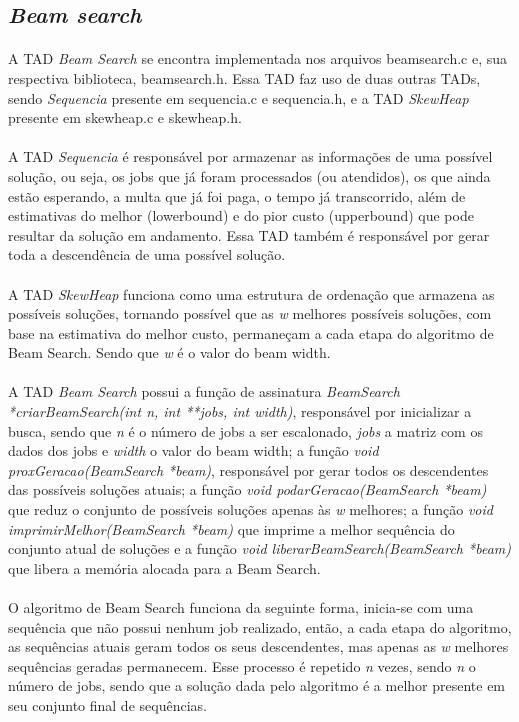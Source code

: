 \documentclass[12pt,a4paper]{article}
\begin{document}
  \subsection{{\it Beam search}}
   {\paragraph{} A TAD {\it Beam Search} se encontra implementada nos arquivos beamsearch.c e, sua respectiva biblioteca, beamsearch.h.
   Essa TAD faz uso de duas outras TADs, sendo {\it Sequencia} presente em sequencia.c e sequencia.h, e a TAD {\it SkewHeap} presente
   em skewheap.c e skewheap.h.}
   {\paragraph{} A TAD {\it Sequencia} é responsável por armazenar as informações de uma possível solução, ou seja, os jobs
   que já foram processados (ou atendidos), os que ainda estão esperando, a multa que já foi paga, o tempo já transcorrido, além
   de estimativas do melhor (lowerbound) e do pior custo (upperbound) que pode resultar da solução em andamento. Essa TAD também é responsável por gerar
   toda a descendência de uma possível solução.}
   {\paragraph{} A TAD {\it SkewHeap} funciona como uma estrutura de ordenação que armazena as possíveis soluções, tornando
   possível que as \emph{w} melhores possíveis soluções, com base na estimativa do melhor custo, permaneçam a cada etapa do
   algoritmo de Beam Search. Sendo que \emph{w} é o valor do beam width.}
   {\paragraph{} A TAD {\it Beam Search} possui a função de assinatura \emph{BeamSearch *criarBeamSearch(int n, int **jobs, int width)},
   responsável por inicializar a busca, sendo que \emph{n} é o número de jobs a ser escalonado, \emph{jobs} a matriz com os dados
   dos jobs e \emph{width} o valor do beam width; a função \emph{void proxGeracao(BeamSearch *beam)}, responsável por gerar todos os descendentes
   das possíveis soluções atuais; a função \emph{void podarGeracao(BeamSearch *beam)} que reduz o conjunto de possíveis soluções
   apenas às \emph{w} melhores; a função \emph{void imprimirMelhor(BeamSearch *beam)} que imprime a melhor sequência do conjunto
   atual de soluções e a função \emph{void liberarBeamSearch(BeamSearch *beam)} que libera a memória alocada para a Beam Search.}
   {\paragraph{} O algoritmo de Beam Search funciona da seguinte forma, inicia-se com uma sequência que não possui nenhum job realizado,
   então, a cada etapa do algoritmo, as sequências atuais geram todos os seus descendentes, mas apenas as \emph{w} melhores sequências
   geradas permanecem. Esse processo é repetido \emph{n} vezes, sendo \emph{n} o número de jobs, sendo que a solução dada pelo
   algoritmo é a melhor presente em seu conjunto final de sequências.}
\end{document}
